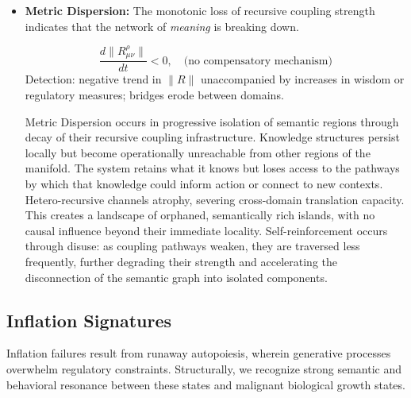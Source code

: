 \begin{itemize}
    \item \textbf{Metric Dispersion:} The monotonic loss of recursive coupling strength indicates that the network of \textit{meaning} is breaking down.

    \begin{equation}
    \frac{d\|R^\rho_{\mu\nu}\|}{dt} < 0, \quad \text{(no compensatory mechanism)}
    \end{equation}
    Detection: negative trend in \(\|R\|\) unaccompanied by increases in wisdom or regulatory measures; bridges erode between domains.

    Metric Dispersion occurs in progressive isolation of semantic regions through decay of their recursive coupling infrastructure. Knowledge structures persist locally but become operationally unreachable from other regions of the manifold. The system retains what it knows but loses access to the pathways by which that knowledge could inform action or connect to new contexts. Hetero-recursive channels atrophy, severing cross-domain translation capacity. This creates a landscape of orphaned, semantically rich islands, with no causal influence beyond their immediate locality. Self-reinforcement occurs through disuse: as coupling pathways weaken, they are traversed less frequently, further degrading their strength and accelerating the disconnection of the semantic graph into isolated components.

\end{itemize}


\subsection{Inflation Signatures}
\label{16.2.3:inflation_signatures}

Inflation failures result from runaway autopoiesis, wherein generative processes overwhelm regulatory constraints. Structurally, we recognize strong semantic and behavioral resonance between these states and malignant biological growth states.

